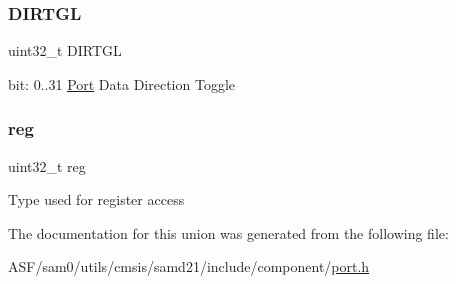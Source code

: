 \subsubsection{\texorpdfstring{DIRTGL}{DIRTGL}}
{\footnotesize\ttfamily uint32\+\_\+t D\+I\+R\+T\+GL}

bit\+: 0..31 \mbox{\hyperlink{struct_port}{Port}} Data Direction Toggle \mbox{\label{union_p_o_r_t___d_i_r_t_g_l___type_a6b91636401516a477989a336376d7b40}} 
\subsubsection{\texorpdfstring{reg}{reg}}
{\footnotesize\ttfamily uint32\+\_\+t reg}

Type used for register access 

The documentation for this union was generated from the following file\+:\begin{DoxyCompactItemize}
\item 
A\+S\+F/sam0/utils/cmsis/samd21/include/component/\mbox{\hyperlink{utils_2cmsis_2samd21_2include_2component_2port_8h}{port.\+h}}\end{DoxyCompactItemize}
